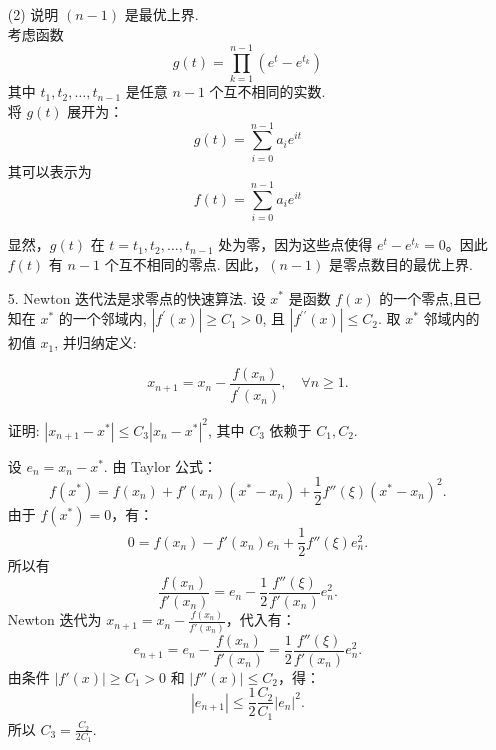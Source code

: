 \begin{enumerate}
\begin{solution}
        (2) 说明 $(n-1)$ 是最优上界.\\
        考虑函数 
        \[
        g(t) = \prod_{k=1}^{n-1} (e^t - e^{t_k})
        \]
        其中 $t_1, t_2, \ldots, t_{n-1}$ 是任意 $n-1$ 个互不相同的实数.\\将 $g(t)$ 展开为：
        \[
        g(t) = \sum_{i=0}^{n-1} a_i e^{it}
        \]
        其可以表示为 
        \[
        f(t) = \sum_{i=0}^{n-1} a_i e^{it}
        \]

        显然，$g(t)$ 在 $t = t_1, t_2, \ldots, t_{n-1}$ 处为零，因为这些点使得 $e^t - e^{t_k} = 0$。因此 $f(t)$ 有 $n-1$ 个互不相同的零点.
        因此，$(n-1)$ 是零点数目的最优上界.
    \end{solution}

    \item[5.] Newton 迭代法是求零点的快速算法. 设 $x^{*}$ 是函数 $f(x)$ 的一个零点,且已知在 $x^{*}$ 的一个邻域内, 
    $\displaystyle|f^{\prime}(x)|\geq C_{1} > 0$, 且 $\displaystyle|f^{\prime \prime}(x)|\leq C_{2}$.
    取 $x^{*}$ 邻域内的初值 $x_{1}$, 并归纳定义:

    \[\displaystyle x_{n + 1} = x_{n} - \frac{f(x_{n})}{f^{\prime}(x_{n})},\quad \forall n\geq 1.\]

    证明: $\displaystyle|x_{n + 1} - x^{*}|\leq C_{3}|x_{n} - x^{*}|^{2}$, 其中 $C_{3}$ 依赖于 $C_{1},C_{2}$.
    \begin{solution}
        设 $\displaystyle e_n = x_n - x^* $. 由 Taylor 公式：
        \[
        f(x^*) = f(x_n) + f'(x_n)(x^* - x_n) + \frac{1}{2} f''(\xi)(x^* - x_n)^2.
        \]
        由于 $\displaystyle f(x^*) = 0 $，有：
        \[
        0 = f(x_n) - f'(x_n) e_n + \frac{1}{2} f''(\xi) e_n^2.
        \]
        所以有
        \[
        \frac{f(x_n)}{f'(x_n)} = e_n - \frac{1}{2} \frac{f''(\xi)}{f'(x_n)} e_n^2.
        \]
        Newton 迭代为 $\displaystyle x_{n+1} = x_n - \frac{f(x_n)}{f'(x_n)} $，代入有：
        \[
        e_{n+1} = e_n - \frac{f(x_n)}{f'(x_n)} = \frac{1}{2} \frac{f''(\xi)}{f'(x_n)} e_n^2.
        \]
        由条件 $\displaystyle |f'(x)| \geq C_1 > 0 $ 和 $ |f''(x)| \leq C_2 $，得：
        \[
        |e_{n+1}| \leq \frac{1}{2} \frac{C_2}{C_1} |e_n|^2.
        \]
        所以 $\displaystyle C_3 = \frac{C_2}{2 C_1} $.
    \end{solution}


\end{enumerate}
